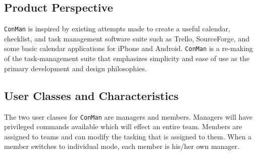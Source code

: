 \documentclass{article}
\begin{document}
\subsection{Product Perspective}
\texttt{ConMan} is inspired by existing attempts made to create a useful calendar, checklist, and task management software suite such as Trello, SourceForge, and some basic calendar applications for iPhone and Android.  \texttt{ConMan} is a re-making of the task-management suite that emphasizes simplicity and ease of use as the primary development and design philosophies.

\subsection{User Classes and Characteristics}
The two user classes for \texttt{ConMan} are managers and members.  
Managers will have privileged commands available which will effect an entire team.
Members are assigned to teams and can modify the tasking that is assigned to them.
When a member switches to individual mode, each member is his/her own manager.
\end{document}
